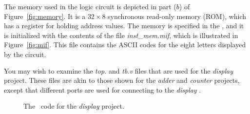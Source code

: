 {The memory used in the logic circuit is depicted in part ($b$) of Figure~\ref{fig:memory}. It
is a $32 \times 8$ synchronous read-only memory (ROM), which has a register for holding 
address values. The memory is specified in the 
\fi, and it is 
initialized with the contents of the file {\it inst\_mem.mif},
which is illustrated in Figure~\ref{fig:mif}. This file contains the ASCII codes for the 
eight letters displayed by the circuit.

You may wish to examine the {\it top.\hdlFileExt} and {\it tb.v} files that are 
used for the {\it display} project.  These files are akin to those shown for the 
{\it adder} and {\it counter} projects, except that different ports are used for 
connecting to the {\it display} \hdlModuleName. 

\begin{figure}[h]
\begin{center}
\begin{minipage}[h]{15 cm}
\ifverilog
	\ifnotSV
        
    \else
        
    \fi
\else
	
\fi
\end{minipage}
	\caption{The \hdlName~code for the {\it display} project\ifverilog{}\fi.}
	\label{fig:display}
\end{center}
\end{figure}

\ifverilog
{}
\else
    \begin{center}
    \begin{minipage}[h]{15 cm}
	    
    \end{minipage}
    \end{center}
\fi

}
